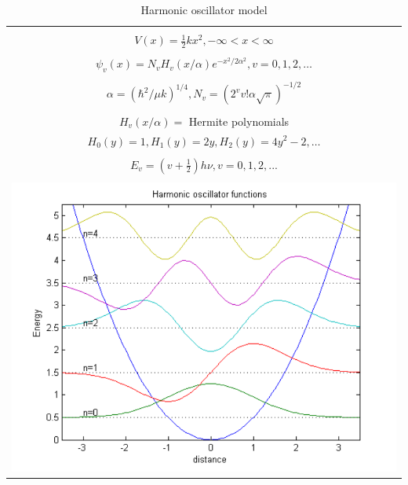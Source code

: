 \documentclass[11pt]{article}
\begin{document}
\begin{outline}
\begin{table}[tbh]
   \begin{center}
   \caption{Harmonic oscillator model}
    \label{Harmonic-oscillator}
\begin{tabular}[h]{|c|}
\hline
 \\
$\displaystyle       V(x) = \frac{1}{2} k x^2, -\infty < x < \infty $ \\
 \\
$\displaystyle     \psi_v(x) = N_v H_v(x/\alpha)e^{-x^2/2\alpha^2}, v = 0, 1, 2, \ldots $ \\
\\
$\displaystyle \alpha=(\hbar^2/\mu k)^{1/4}, N_v=(2^vv!\alpha\sqrt{\pi})^{-1/2} $ \\
 \\
$\displaystyle  H_v(x/\alpha)=$ Hermite polynomials \\
$\displaystyle H_0(y) =1, H_1(y) = 2y, H_2(y) = 4y^2-2, \ldots $ \\ 
 \\
$\displaystyle     E_v=(v+\frac{1}{2})h \nu, v=0, 1, 2, ...$ \\
 \\
     \includegraphics[scale=.6]{Images/HO} \\       
\hline
\end{tabular}
 \end{center}
\end{table}


\end{outline}
\end{document}
